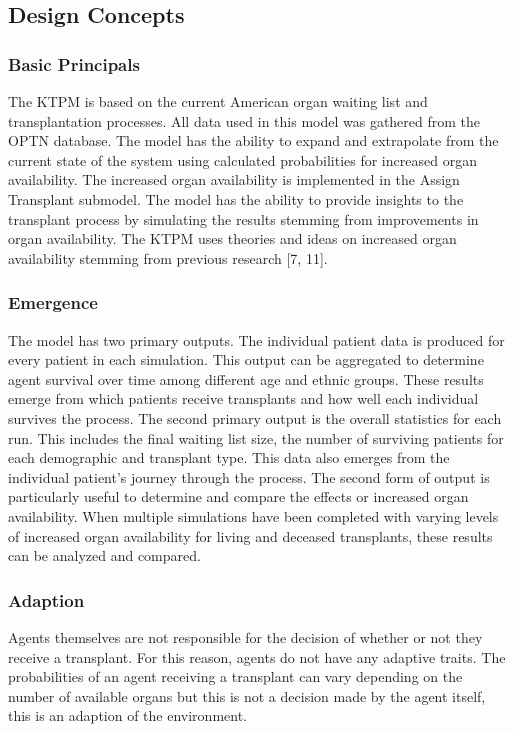 \documentclass[9pt,a4paper,twocolumn]{scrartcl}
\begin{document}
\subsection{Design Concepts}
\subsubsection{Basic Principals}
The KTPM is based on the current American organ waiting list and transplantation processes.  All data used in this model was gathered from the OPTN database.  The model has the ability to expand and extrapolate from the current state of the system using calculated probabilities for increased organ availability.  The increased organ availability is implemented in the Assign Transplant submodel.  
The model has the ability to provide insights to the transplant process by simulating the results stemming from improvements in organ availability.  The KTPM uses theories and ideas on increased organ availability stemming from previous research [7, 11]. 

\subsubsection{Emergence}
The model has two primary outputs.  The individual patient data is produced for every patient in each simulation.  This output can be aggregated to determine agent survival over time among different age and ethnic groups.  These results emerge from which patients receive transplants and how well each individual survives the process.  The second primary output is the overall statistics for each run.  This includes the final waiting list size, the number of surviving patients for each demographic and transplant type.  This data also emerges from the individual patient’s journey through the process.
The second form of output is particularly useful to determine and compare the effects or increased organ availability.  When multiple simulations have been completed with varying levels of increased organ availability for living and deceased transplants, these results can be analyzed and compared.

\subsubsection{Adaption}
Agents themselves are not responsible for the decision of whether or not they receive a transplant.  For this reason, agents do not have any adaptive traits.  The probabilities of an agent receiving a transplant can vary depending on the number of available organs but this is not a decision made by the agent itself, this is an adaption of the environment.
\end{document}
